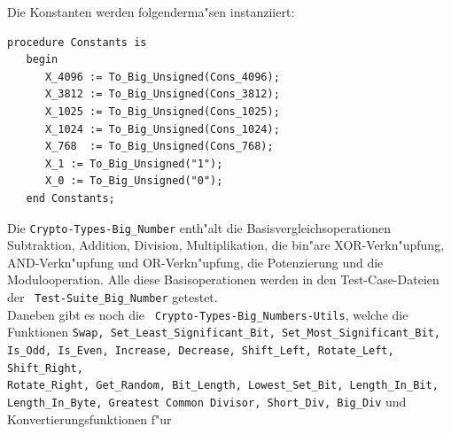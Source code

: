 Die Konstanten werden folgenderma"sen instanziiert:

\begin{lstlisting}
procedure Constants is
   begin
      X_4096 := To_Big_Unsigned(Cons_4096);
      X_3812 := To_Big_Unsigned(Cons_3812);
      X_1025 := To_Big_Unsigned(Cons_1025);
      X_1024 := To_Big_Unsigned(Cons_1024);
      X_768  := To_Big_Unsigned(Cons_768);
      X_1 := To_Big_Unsigned("1");
      X_0 := To_Big_Unsigned("0");
   end Constants;
\end{lstlisting}

Die {\tt Crypto-Types-Big\_Number} enth"alt die
Basisvergleichsoperationen Subtraktion, Addition, Division,
Multiplikation, die bin"are XOR-Verkn"upfung, AND-Verkn"upfung und
OR-Verkn"upfung, die Potenzierung und die Modulooperation.  Alle diese
Basisoperationen werden in den Test-Case-Dateien der {\tt
  Test-Suite\_Big\_Number} getestet.\\ Daneben gibt es noch die {\tt
  Crypto-Types-Big\_Numbers-Utils}, welche die Funktionen {\tt Swap,
  Set\_Least\_Significant\_Bit, Set\_Most\_Significant\_Bit, Is\_Odd,
  Is\_Even, Increase, Decrease, Shift\_Left, Rotate\_Left,
  Shift\_Right,\\ Rotate\_Right, Get\_Random, Bit\_Length,
  Lowest\_Set\_Bit, Length\_In\_Bit, Length\_In\_Byte, Greatest Common
  Divisor, Short\_Div, Big\_Div} und Konvertierungsfunktionen f"ur
